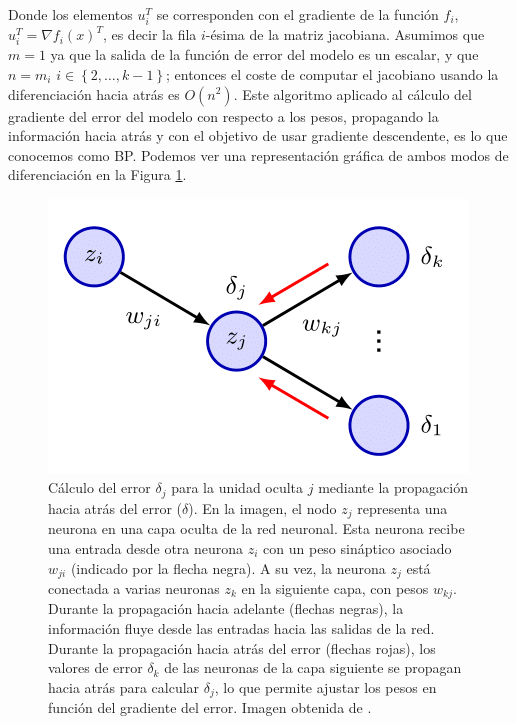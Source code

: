 Donde los elementos $u_i^T$ se corresponden con el gradiente de la función $f_i$, $u_i^T=\nabla f_i(x)^T$, es decir la fila $i$-ésima de la matriz jacobiana. Asumimos que $m=1$ ya que la salida de la función de error del modelo es un escalar, y que $n=m_i$ $i \in \left \{2,\ldots, k-1 \right \}$; entonces el coste de computar el jacobiano usando la diferenciación hacia atrás es $O(n^2)$. Este algoritmo aplicado al cálculo del gradiente del error del modelo con respecto a los pesos, propagando la información hacia atrás y con el objetivo de usar gradiente descendente, es lo que conocemos como BP.  Podemos ver una representación gráfica de ambos modos de diferenciación en la Figura \ref{fig:bp_1}.

\begin{figure}
    \centering
    \includegraphics[width=0.7\linewidth]{Plantilla_TFG_latex/imagenes/Mat/Definicion/bp_1.png}
    \caption[Cálculo del error para una unidad oculta ilustando la propagación hacia delante y la propagación hacia atrás del error]{Cálculo del error $\delta_j$ para la unidad oculta $j$ mediante la propagación hacia atrás del error ($\delta$). En la imagen, el nodo $z_j$ representa una neurona en una capa oculta de la red neuronal. Esta neurona recibe una entrada desde otra neurona $z_i$ con un peso sináptico asociado $w_{ji}$ (indicado por la flecha negra). A su vez, la neurona $z_j$ está conectada a varias neuronas $z_k$ en la siguiente capa, con pesos $w_{kj}$. Durante la propagación hacia adelante (flechas negras), la información fluye desde las entradas hacia las salidas de la red. Durante la propagación hacia atrás del error (flechas rojas), los valores de error $\delta_k$ de las neuronas de la capa siguiente se propagan hacia atrás para calcular $\delta_j$, lo que permite ajustar los pesos en función del gradiente del error. Imagen obtenida de \cite{bishop2023learning}.}
    \label{fig:bp_1}
\end{figure}


